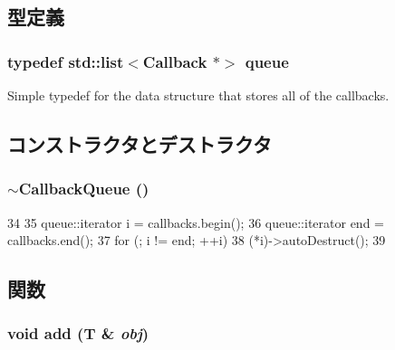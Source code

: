 \subsection{型定義}
\hypertarget{classCallbackQueue_acff8b7ceee019b76371bd54bb1249350}{
\subsubsection[{queue}]{\setlength{\rightskip}{0pt plus 5cm}typedef {\bf std::list}$<${\bf Callback} $\ast$$>$ {\bf queue}}}
\label{classCallbackQueue_acff8b7ceee019b76371bd54bb1249350}
Simple typedef for the data structure that stores all of the callbacks. 

\subsection{コンストラクタとデストラクタ}
\hypertarget{classCallbackQueue_a10ceab855dc1cc8986eca6ed6cf7cf83}{
\subsubsection[{$\sim$CallbackQueue}]{\setlength{\rightskip}{0pt plus 5cm}$\sim${\bf CallbackQueue} ()}}
\label{classCallbackQueue_a10ceab855dc1cc8986eca6ed6cf7cf83}



\begin{DoxyCode}
34 {
35     queue::iterator i = callbacks.begin();
36     queue::iterator end = callbacks.end();
37     for (; i != end; ++i)
38         (*i)->autoDestruct();
39 }
\end{DoxyCode}


\subsection{関数}
\hypertarget{classCallbackQueue_a234331465f9a22334474727a02218f51}{
\subsubsection[{add}]{\setlength{\rightskip}{0pt plus 5cm}void add (T \& {\em obj})}}
\label{classCallbackQueue_a234331465f9a22334474727a02218f51}



